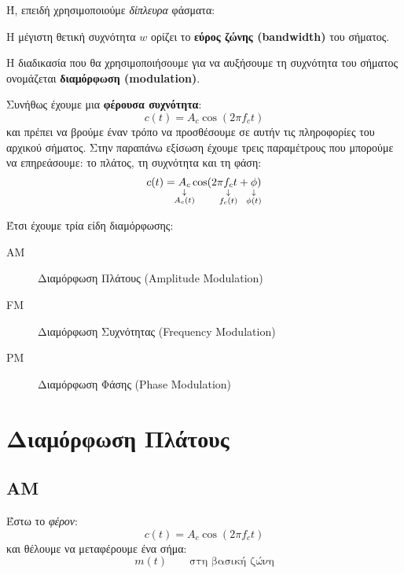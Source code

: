 \documentclass[11pt,a4paper,notitlepage,fleqn,final]{article}
\begin{document}
Ή, επειδή χρησιμοποιούμε \textit{δίπλευρα} φάσματα:


Η μέγιστη θετική συχνότητα \( w \) ορίζει το \textbf{εύρος ζώνης (bandwidth)} του σήματος.

Η διαδικασία που θα χρησιμοποιήσουμε για να αυξήσουμε τη συχνότητα του σήματος ονομάζεται
\textbf{διαμόρφωση (modulation)}.

Συνήθως έχουμε μια \textbf{φέρουσα συχνότητα}:
\[
c(t) = A_c\cos(2\pi f_c t)
\]
και πρέπει να βρούμε έναν τρόπο να προσθέσουμε σε αυτήν τις πληροφορίες του αρχικού σήματος.
Στην παραπάνω εξίσωση έχουμε τρεις παραμέτρους που μπορούμε να επηρεάσουμε: το πλάτος,
τη συχνότητα και τη φάση:
\[
c(t) =
\underset{\substack{\downarrow\\\mathclap{A_c(t)}}}{A_c}
\cos(2\pi
\underset{\substack{\downarrow\\\mathclap{f_c(t)}}}{f_c}
t
+
\underset{\substack{\downarrow\\\mathclap{\phi(t)}}}{\phi}
)
\]

Έτσι έχουμε τρία είδη διαμόρφωσης:
\begin{description}
	\item[AM] Διαμόρφωση Πλάτους (Amplitude Modulation)
	\item[FM] Διαμόρφωση Συχνότητας (Frequency Modulation)
	\item[PM] Διαμόρφωση Φάσης (Phase Modulation)
\end{description}

\newpage

\section{Διαμόρφωση Πλάτους}

\subsection{AM}
Έστω το \emph{φέρον}:
\[
c(t) = A_c\cos(2\pi f_c t)
\]
και θέλουμε να μεταφέρουμε ένα σήμα:
\[
m(t) \qquad \text{στη βασική ζώνη}
\]
\end{document}
